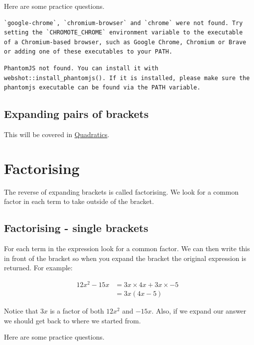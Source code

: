 \documentclass[
  a4paper,
]{scrbook}
\begin{document}
Here are some practice questions.

\begin{verbatim}
`google-chrome`, `chromium-browser` and `chrome` were not found. Try setting the `CHROMOTE_CHROME` environment variable to the executable of a Chromium-based browser, such as Google Chrome, Chromium or Brave or adding one of these executables to your PATH.
\end{verbatim}

\begin{verbatim}
PhantomJS not found. You can install it with webshot::install_phantomjs(). If it is installed, please make sure the phantomjs executable can be found via the PATH variable.
\end{verbatim}

\subsection{Expanding pairs of
brackets}\label{expanding-pairs-of-brackets}

This will be covered in \hyperref[quadratics]{Quadratics}.

\section{Factorising}\label{factorising}

The reverse of expanding brackets is called factorising. We look for a
common factor in each term to take outside of the bracket.

\subsection{Factorising - single
brackets}\label{factorising---single-brackets}

For each term in the expression look for a common factor. We can then
write this in front of the bracket so when you expand the bracket the
original expression is returned. For example:

\[
\begin{aligned} 12x^2 - 15x &= 3x \times 4x + 3x \times -5 \\
&= 3x(4x-5)
\end{aligned}
\]

Notice that \(3x\) is a factor of both \(12x^2\) and \(-15x\). Also, if
we expand our answer we should get back to where we started from.

Here are some practice questions.
\end{document}
